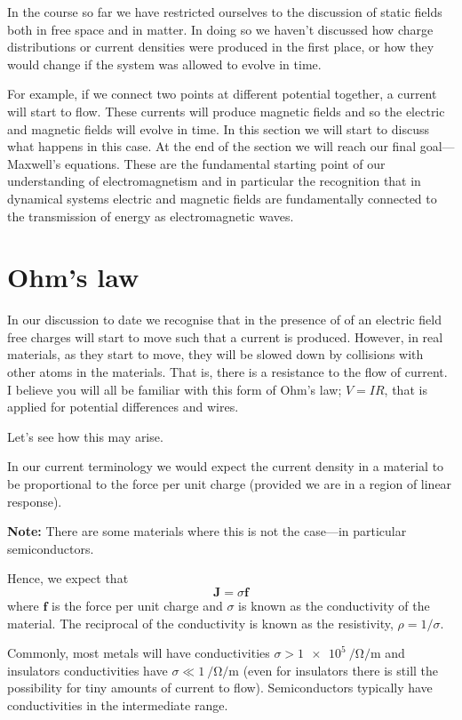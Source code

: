 \documentclass[12pt,chapterprefix=false,dvipsnames]{scrbook}
\theoremstyle{dotless}
\theoremstyle{definition}
\begin{document}
In the course so far we have restricted ourselves to the
discussion of static fields both in free space and in matter. In
doing so we haven't discussed how charge distributions or
current densities were produced in the first place, or how they
would change if the system was allowed to evolve in time.

For example, if we connect two points at different potential
together, a current will start to flow. These currents will
produce magnetic fields and so the electric and magnetic fields
will evolve in time. In this section we will start to discuss
what happens in this case. At the end of the section we will
reach our final goal---Maxwell's equations. These are the
fundamental starting point of our understanding of
electromagnetism and in particular the recognition that in
dynamical systems electric and magnetic fields are fundamentally
connected to the transmission of energy as electromagnetic
waves.

\section{Ohm's law}%
\label{sec:ohm_s_law}

In our discussion to date we recognise that in the presence of
of an electric field free charges will start to move such that a
current is produced. However, in real materials, as they start
to move, they will be slowed down by collisions with other atoms
in the materials. That is, there is a resistance to the flow of
current. I believe you will all be familiar with this form of
Ohm's law; $V = I R$, that is applied for
potential differences and wires.

Let's see how this may arise.

In our current terminology we would expect the current density
in a material to be proportional to the force per unit charge
(provided we are in a region of linear response).

\textbf{Note:} There are some materials where this is
not the case---in particular semiconductors.

Hence, we expect that
\begin{equation}
	\bm{J} = \sigma\bm{f}
\end{equation}
where $\bm{f}$ is the force per unit charge and
$\sigma$ is known as the conductivity of the
material. The reciprocal of the conductivity is known as the
resistivity, $\rho = 1/\sigma$.

Commonly, most metals will have conductivities
$\sigma > \SI{1e5}{\per\ohm\per\metre}$ and insulators conductivities have
$\sigma \ll \SI{1}{\per\ohm\per\metre}$ (even for insulators there is still the
possibility for tiny amounts of current to flow). Semiconductors
typically have conductivities in the intermediate range.
\end{document}
